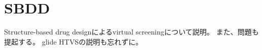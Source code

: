 \chapter{SBDD}
Structure-based drug designによるvirtual screeningについて説明。
また、問題も提起する。
glide HTVSの説明も忘れずに。